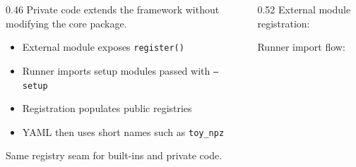 \begin{frame}

  \vspace{14mm}
  \begin{columns}[T,onlytextwidth]
    \begin{column}{0.46\textwidth}
      {\small Private code extends the framework without modifying the core package.}\par
      \vspace{2mm}
      \begin{itemize}
        \item External module exposes \texttt{register()}
        \item Runner imports setup modules passed with \texttt{--setup}
        \item Registration populates public registries
        \item YAML then uses short names such as \texttt{toy\_npz}
      \end{itemize}

      \vspace{1mm}
      {\scriptsize Same registry seam for built-ins and private code.}
    \end{column}
    \begin{column}{0.52\textwidth}
      {\scriptsize External module registration:}\par
      \vspace{1mm}
      
      \vspace{1mm}
      {\scriptsize Runner import flow:}\par
      \vspace{1mm}
      
      \vspace{1mm}
      
    \end{column}
  \end{columns}

  \slideheaderfooter
\end{frame}
